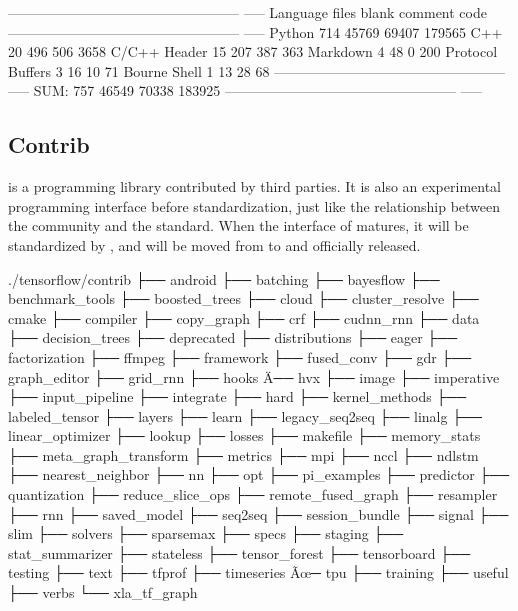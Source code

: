 \begin{content}
\begin{leftbar}
\begin{python}[caption={Python Code Statistics}]
-------------------------------------------------- -----
Language            files     blank   comment      code
-------------------------------------------------- -----
Python                714     45769     69407    179565
C++                    20       496       506      3658
C/C++ Header           15       207       387       363
Markdown 4 48 0 200
Protocol Buffers        3        16        10        71
Bourne Shell            1        13        28        68
-------------------------------------------------- -----
SUM:                  757     46549     70338    183925
-------------------------------------------------- -----
\end{python}
\end{leftbar}

\subsection{Contrib}

 is a programming library contributed by third parties. It is also an experimental programming interface before \tf{} standardization, just like the relationship between the  community and the  standard. When the interface of  matures, it will be standardized by \tf{}, and will be moved from  to  and officially released.

\begin{leftbar}
\begin{python}[caption={Contrib source structure}]
./tensorflow/contrib
├── android
├── batching
├── bayesflow
├── benchmark_tools
├── boosted_trees
├── cloud
├── cluster_resolve
├── cmake
├── compiler
├── copy_graph
├── crf
├── cudnn_rnn
├── data
├── decision_trees
├── deprecated
├── distributions
├── eager
├── factorization
├── ffmpeg
├── framework
├── fused_conv
├── gdr
├── graph_editor
├── grid_rnn
├── hooks
Ä── hvx
├── image
├── imperative
├── input_pipeline
├── integrate
├── hard
├── kernel_methods
├── labeled_tensor
├── layers
├── learn
├── legacy_seq2seq
├── linalg
├── linear_optimizer
├── lookup
├── losses
├── makefile
├── memory_stats
├── meta_graph_transform
├── metrics
├── mpi
├── nccl
├── ndlstm
├── nearest_neighbor
├── nn
├── opt
├── pi_examples
├── predictor
├── quantization
├── reduce_slice_ops
├── remote_fused_graph
├── resampler
├── rnn
├── saved_model
├── seq2seq
├── session_bundle
├── signal
├── slim
├── solvers
├── sparsemax
├── specs
├── staging
├── stat_summarizer
├── stateless
├── tensor_forest
├── tensorboard
├── testing
├── text
├── tfprof
├── timeseries
Ãœ─ tpu
├── training
├── useful
├── verbs
└── xla_tf_graph
\end{python}
\end{leftbar}


\end{content}
